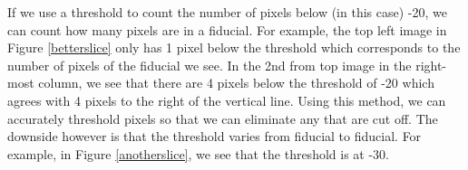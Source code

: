 \documentclass[10pt]{scrartcl}
\begin{document}

If we use a threshold to count the number of pixels below (in this case) -20, we can count how many pixels are in a fiducial. For example, the top left image in Figure \ref{betterslice} only has 1 pixel below the threshold which corresponds to the number of pixels of the fiducial we see. In the 2nd from top image in the right-most column, we see that there are 4 pixels below the threshold of -20 which agrees with 4 pixels to the right of the vertical line. Using this method, we can accurately threshold pixels so that we can eliminate any that are cut off. The downside however is that the threshold varies from fiducial to fiducial. For example, in Figure \ref{anotherslice}, we see that the threshold is at -30.
\end{document}
